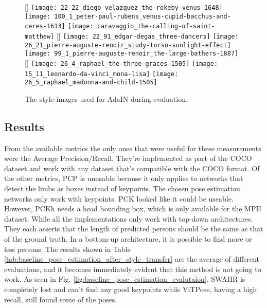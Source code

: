\begin{figure}
    \centering
	[\textwidth]{%
		\texttt{[image: 22\_22\_diego-velazquez\_the-rokeby-venus-1648]}%
		\texttt{[image: 100\_1\_peter-paul-rubens\_venus-cupid-bacchus-and-ceres-1613]}%
		\texttt{[image: caravaggio\_the-calling-of-saint-matthew]}%
	}
	[\textwidth]{%
        \texttt{[image: 22\_91\_edgar-degas\_three-dancers]}%
        \texttt{[image: 26\_21\_pierre-auguste-renoir\_study-torso-sunlight-effect]}%
        \texttt{[image: 99\_1\_pierre-auguste-renoir\_the-large-bathers-1887]}%
	}
	[\textwidth]{%
        \texttt{[image: 26\_4\_raphael\_the-three-graces-1505]}%
        \texttt{[image: 15\_11\_leonardo-da-vinci\_mona-lisa]}%
        \texttt{[image: 26\_5\_raphael\_madonna-and-child-1505]}%
	}
	\label{fig:baseline_style_images_adain_evaluation}
	\caption{
		The style images used for AdaIN during evaluation.
	}
\end{figure}

\subsection{Results}
\label{sec:baseline_results_coco_style_transfer}
From the available metrics the only ones that were useful for these measurements were the Average Precision/Recall.
They're implemented as part of the COCO dataset and work with any dataset that's compatible with the COCO format.
Of the other metrics, \gls{PCP} is unusable because it only applies to networks that detect the limbs as boxes instead of keypoints.
The chosen pose estimation networks only work with keypoints.
\gls{PCK} looked like it could be useable. However, PCKh needs a head bounding box, which is only available for the MPII dataset.
While all the implementations only work with top-down architectures.
They each asserts that the length of predicted persons should be the same as that of the ground truth.
In a bottom-up architecture, it is possible to find more or less persons.
The results shown in Table \ref{tab:baseline_pose_estimation_after_style_transfer} are the average of different evaluations, and it becomes immediately evident that this method is not going to work.
As seen in Fig. \ref{fig:baseline_pose_estimation_evalutaion}, SWAHR is completely lost and can't find any good keypoints while ViTPose, having a high recall, still found some of the poses. 

